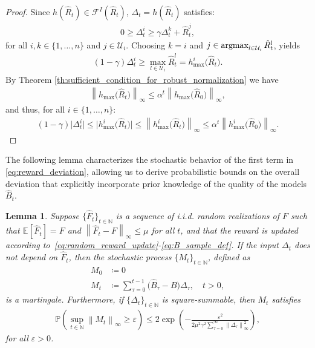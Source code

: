 \documentclass[10pt,leqno]{amsart}
\newcommand{\sml}{\scriptscriptstyle}
\newcommand{\norm}[1]{\left \|#1 \right \|}
\newcommand{\argmax}{\mathop{\rm argmax}}
\newcommand{\N}{\mathbb{N}}
\newcommand{\U}{\mathcal{U}}
\newcommand{\Cost}{R}
\newcommand{\F}{F}
\newcommand{\Fapx}{\hat{F}}
\newcommand{\disc}{\gamma}
\newcommand{\invset}[1]{\mathcal{F}^{\sml I}(#1)}
\newcommand{\B}{B}
\newcommand{\infnorm}[1]{\norm{#1}_\infty}
\newcommand{\outmap}{h_{\sml \text{max}}}
\newcommand{\prob}{\mathbb{P}}
\newcommand{\E}[2]{\mathbb{E}_{#1}\left[#2\right]}
\newcommand{\Bapx}{\hat{B}}
\newcommand{\Costpert}{\hat{\Cost}}
\newtheorem{lemma}[theorem]{Lemma}
\begin{document}
\begin{proof}
    Since $h(\Costpert_t) \in \invset{\Costpert_t}$, $\Delta_t = h(\Costpert_t)$ satisfies:
    \begin{align*}
        0 \geq \Delta_t^i \geq \disc \Delta_t^k + \Costpert_t^j,
    \end{align*}
    for all $i, k \in \{1, \hdots, n\}$ and $j \in \U_i$. Choosing $k = i$ and $j \in \argmax_{l \in \U_i} \Costpert_t^l$, yields
    \begin{align*}
        (1 - \disc) \Delta_t^i \geq \max_{l \in \U_i} \Costpert_t^l = \outmap^i\bigl(\Costpert_t\bigr).
    \end{align*}
    By Theorem \ref{th:sufficient_condition_for_robust_normalization} we have
    \begin{align*}
        \infnorm{\outmap\bigl(\Costpert_t\bigr)} \leq \alpha^t \infnorm{\outmap\bigl(\Costpert_0\bigr)},
    \end{align*}
    and thus, for all $i \in \{1, \hdots, n\}$:
    \begin{align*}
        (1 - \disc) \bigl|\Delta_t^i\bigr| \leq \bigl|\outmap^i\bigl(\Costpert_t\bigr)\bigr| \leq \infnorm{\outmap^i\bigl(\Costpert_t\bigr)} \leq \alpha^t \infnorm{\outmap^i\bigl(\Costpert_0\bigr)}.
    \end{align*}
\end{proof}
The following lemma characterizes the stochastic behavior of the first term in \eqref{eq:reward_deviation}, allowing us to derive probabilistic bounds on the overall deviation that explicitly incorporate prior knowledge of the quality of the models $\Bapx_t$.
\begin{lemma}\label{lem:martingale_properties}
    Suppose $\{\Fapx_t\}_{t \in \N}$ is a sequence of i.i.d. random realizations of $\F$ such that $\E{}{\Fapx_t} = \F$ and $\infnorm{\Fapx_t - \F} \leq \mu$ for all $t$, and that the reward is updated according to~\eqref{eq:random_reward_update}-\eqref{eq:B_sample_def}. If the input $\Delta_t$ does not depend on $\Fapx_t$, then the stochastic process $\{M_t\}_{t \in \N}$, defined as
    \begin{subequations}\label{eq:martingale_def}
        \begin{align}
            M_0 &\coloneqq 0\\
            M_t &\coloneqq \sum_{\tau = 0}^{t-1} \bigl(\Bapx_\tau - \B\bigr)\Delta_\tau, \quad t > 0,
        \end{align}
    \end{subequations}
    is a martingale. Furthermore, if $\{\Delta_t\}_{t \in \N}$ is square-summable, then $M_t$ satisfies
    \begin{align}
        \prob\left(\sup_{t\in\N}\infnorm{M_t} \geq \varepsilon\right) \leq 2 \exp\left(-\frac{\varepsilon^2}{2\mu^2\disc^2\sum_{\tau = 0}^\infty \infnorm{\Delta_\tau}^2}\right),
    \end{align}
    for all $\varepsilon > 0$.
\end{lemma}
\end{document}
